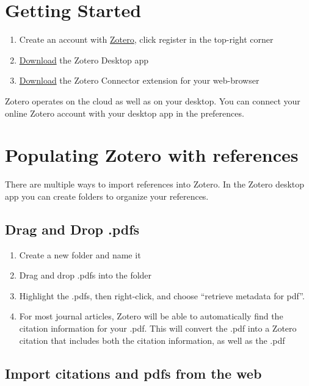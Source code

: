 \documentclass[]{book}
\providecommand{\tightlist}{%
  \setlength{\itemsep}{0pt}\setlength{\parskip}{0pt}}
\theoremstyle{definition}
\theoremstyle{definition}
\theoremstyle{definition}
\theoremstyle{remark}
\begin{document}
\section{Getting Started}\label{getting-started-1}

\begin{enumerate}
\def\labelenumi{\arabic{enumi}.}
\tightlist
\item
  Create an account with \href{https://www.zotero.org}{Zotero}, click
  register in the top-right corner
\item
  \href{https://www.zotero.org/download/}{Download} the Zotero Desktop
  app
\item
  \href{https://www.zotero.org/download/}{Download} the Zotero Connector
  extension for your web-browser
\end{enumerate}

Zotero operates on the cloud as well as on your desktop. You can connect
your online Zotero account with your desktop app in the preferences.

\section{Populating Zotero with
references}\label{populating-zotero-with-references}

There are multiple ways to import references into Zotero. In the Zotero
desktop app you can create folders to organize your references.

\subsection{Drag and Drop .pdfs}\label{drag-and-drop-.pdfs}

\begin{enumerate}
\def\labelenumi{\arabic{enumi}.}
\tightlist
\item
  Create a new folder and name it
\item
  Drag and drop .pdfs into the folder
\item
  Highlight the .pdfs, then right-click, and choose ``retrieve metadata
  for pdf''.
\item
  For most journal articles, Zotero will be able to automatically find
  the citation information for your .pdf. This will convert the .pdf
  into a Zotero citation that includes both the citation information, as
  well as the .pdf
\end{enumerate}

\subsection{Import citations and pdfs from the
web}\label{import-citations-and-pdfs-from-the-web}
\end{document}
